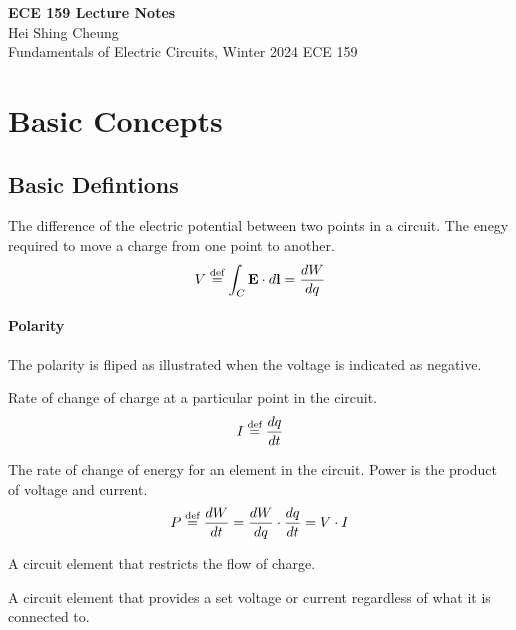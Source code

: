 \documentclass[11pt]{article}
\begin{document}
\thispagestyle{empty}
{\LARGE \bf ECE 159 Lecture Notes}\\
{\large Hei Shing Cheung}\\
Fundamentals of Electric Circuits, Winter 2024 \hfill ECE 159\\
\vspace{10pt}
\section{Basic Concepts}
\subsection{Basic Defintions}
\begin{definition}[Voltage]
    The difference of the electric potential between two points in a circuit. The enegy required to move a charge from one point to another.
    \begin{equation}
        V \stackrel{\text{def}}{=} \int_C \textbf{E} \cdot d\textbf{l} = \frac{dW}{dq}
    \end{equation}
    \end{definition}
    \paragraph{Polarity} The polarity is fliped as illustrated when the voltage is indicated as negative.
    \begin{definition}[Current]
    Rate of change of charge at a particular point in the circuit.
    \begin{equation}
        I \stackrel{\text{def}}{=} \frac{dq}{dt}
    \end{equation}
    \end{definition}
    
    \begin{definition}[Power]
    The rate of change of energy for an element in the circuit. Power is the product of voltage and current.
    \begin{equation}
        P \stackrel{\text{def}}{=} \frac{dW}{dt} = \frac{dW}{dq} \cdot \frac{dq}{dt} = V \cdot I
    \end{equation}
    \end{definition}
    
    \begin{definition}[Resistors]
    A circuit element that restricts the flow of charge.
    \end{definition}
    
    \begin{definition}
    A circuit element that provides a set voltage or current regardless of what it is connected to.
    \end{definition}
    
\end{document}
